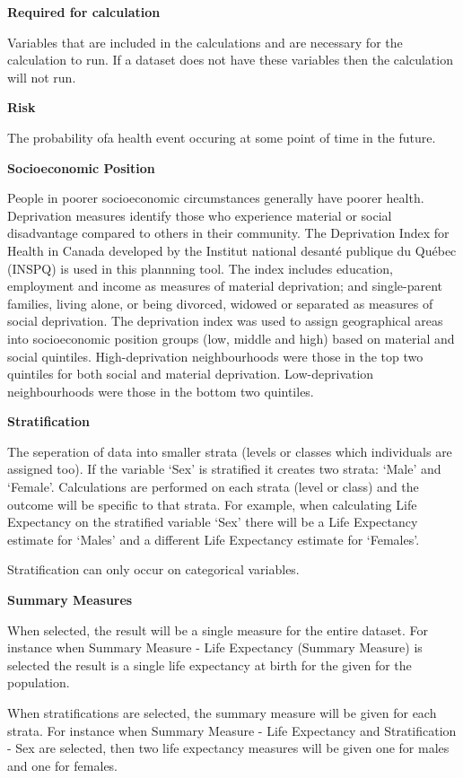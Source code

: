 \documentclass[]{book}
\begin{document}
\textbf{Required for calculation}

Variables that are included in the calculations and are necessary for the calculation to run. If a dataset does not have these variables then the calculation will not run.

\textbf{Risk}

The probability ofa health event occuring at some point of time in the future.

\textbf{Socioeconomic Position}

People in poorer socioeconomic circumstances generally have poorer health. Deprivation measures identify those who experience material or social disadvantage compared to others in their community. The Deprivation Index for Health in Canada developed by the Institut national desanté publique du Québec (INSPQ)\citep{INSPQ2000} is used in this plannning tool. The index includes education, employment and income as measures of material deprivation; and single-parent families, living alone, or being divorced, widowed or separated as measures of social deprivation. The deprivation index was used to assign geographical areas into socioeconomic position groups (low, middle and high) based on material and social quintiles. High-deprivation neighbourhoods were those in the top two quintiles for both social and material deprivation. Low-deprivation neighbourhoods were those in the bottom two quintiles.

\textbf{Stratification}

The seperation of data into smaller strata (levels or classes which individuals are assigned too). If the variable `Sex' is stratified it creates two strata: `Male' and `Female'. Calculations are performed on each strata (level or class) and the outcome will be specific to that strata. For example, when calculating Life Expectancy on the stratified variable `Sex' there will be a Life Expectancy estimate for `Males' and a different Life Expectancy estimate for `Females'.

Stratification can only occur on categorical variables.

\textbf{Summary Measures}

When selected, the result will be a single measure for the entire dataset. For instance when Summary Measure - Life Expectancy (Summary Measure) is selected the result is a single life expectancy at birth for the given for the population.

When stratifications are selected, the summary measure will be given for each strata. For instance when Summary Measure - Life Expectancy and Stratification - Sex are selected, then two life expectancy measures will be given one for males and one for females.
\end{document}
